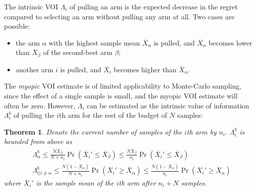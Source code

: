 \documentclass{ecai2012}
\newtheorem{thm}{Theorem}
\begin{document}
The intrinsic VOI $\Lambda_i$ of pulling an arm is the expected decrease
in the regret compared to selecting an arm without pulling any arm at
all. Two cases are possible:
\begin{itemize}
\item the arm $\alpha$ with the highest sample mean $\overline
  X_\alpha$ is pulled, and $\overline X_\alpha$ becomes lower than
  $\overline X_\beta$ of the second-best arm $\beta$;
\item another arm $i$ is pulled, and $\overline X_i$ becomes higher
than $\overline X_\alpha$.
\end{itemize}
The \textit{myopic} VOI estimate is of limited applicability to
Monte-Carlo sampling, since the effect of a single sample is small,
and the myopic VOI estimate will often be zero. However, $\Lambda_i$
can be estimated as the intrinsic value of information $\Lambda_i^b$
of pulling the $i$th arm for the rest of the budget of $N$ samples:
\begin{thm} Denote the current number of samples of the $i$th arm by
  $n_i$. $\Lambda_i^b$ is bounded from above as
\begin{eqnarray}
  &\Lambda_\alpha^b \le \frac {N \overline X_\beta} {N+n_i}\Pr(\overline X_i'\le\overline X_\beta)
    \le \frac {N \overline X_\beta} {n_i} \Pr(\overline X_i'\le\overline X_\beta)\\
&\Lambda_{i|i\ne\alpha}^b \le \frac{ N(1-\overline  X_\alpha)} {N+n_i}\Pr(\overline X_i'\ge\overline X_\alpha)
     \le \frac {N(1-\overline X_\alpha)} {n_i}\Pr(\overline   X_i'\ge\overline X_\alpha)\nonumber
\label{eqn:thm-be}
\end{eqnarray}
where $\overline X_i'$ is the sample mean of the $i$th arm after $n_i+N$ samples.
\label{thm:be}
\end{thm}
\end{document}
